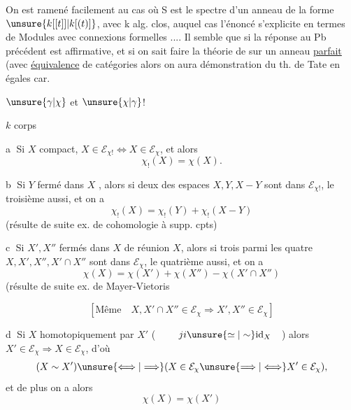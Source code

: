 On est ramené facilement au cas où S est le spectre d'un anneau de la forme $\unsure{k[[t]]|k[(t)]}$, avec k alg. clos, auquel cas l'énoncé s'explicite en termes de Modules avec connexions formelles .... Il semble que si la réponse au Pb précédent est affirmative,  et si on sait faire la théorie de  sur un anneau \uline{parfait} (avec \uline{équivalence} de catégories alors on aura démonstration du th. de Tate en égales car.


$\unsure{\gamma|\chi}$ et $\unsure{\chi|\gamma}$!


$k$ corps


\textcircled{a}  Si $X$ compact, $X\in\mathcal{E}_{\chi!}\Longleftrightarrow X\in\mathcal{E}_{\chi}$, et alors
\[
\chi_!(X)=\chi(X).
\]

\textcircled{b} Si $Y$ fermé dans $X$ , alors si deux des espaces $X,Y,X-Y$ sont dans $\mathcal{E}_{\chi!}$, le troisième aussi, et on a
\[
\chi_!(X)=\chi_!(Y)+\chi_!(X-Y)
\]
(résulte de suite ex. de cohomologie à supp. cpts)

\textcircled{c} Si $X',X''$ fermés dans $X$ de réunion $X$, alors si trois parmi les quatre  $X,X',X'',X'\cap X''$ sont dans $\mathcal{E}_{\chi}$, le quatrième aussi, et on a
\[
\chi(X)=\chi(X')+\chi(X'')-\chi(X'\cap X'')
\]
(résulte de suite ex. de Mayer-Vietoris

\[
[\text{Même}\quad X,X'\cap X''\in\mathcal{E}_{\chi}\Longrightarrow X',X''\in\mathcal{E}_{\chi}]
\]

\textcircled{d} Si $X$   homotopiquement par $X'$
(
$\qquad ji\unsure{\simeq|\sim}\mathrm{id}_X\quad$) alors $X'\in\mathcal{E}_{\chi}\Longrightarrow X\in\mathcal{E}_{\chi}$, d'où
\[
(X\sim X')\unsure{\Longleftrightarrow|\Longrightarrow}(X\in\mathcal{E}_{\chi}\unsure{\Longrightarrow|\Longleftrightarrow}X'\in\mathcal{E}_{\chi}),
\]
et de plus on a alors
\[
\chi(X)=\chi(X')
\]

